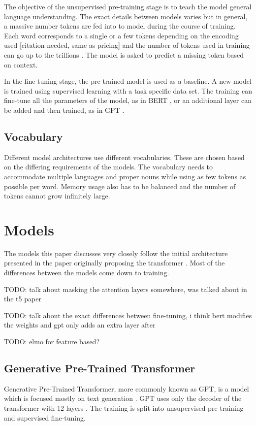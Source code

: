 \documentclass[twoside]{article}
\begin{document}
The objective of the unsupervised pre-training stage is to teach the model
general language understanding. The exact details between models varies but
in general, a massive number tokens are fed into to model during the course
of training. Each word corresponds to a single or a few tokens depending on 
the encoding used [citation needed, same as pricing] and the number of tokens
used in training can go up to the trillions \cite{raffel_exploring_2020}. 
The model is asked to predict a missing token based on context. 

In the fine-tuning stage, the pre-trained model is used as a baseline. A new
model is trained using supervised learning with a task specific data set. 
The training can fine-tune all the parameters of the model, as in BERT 
\cite{devlin_bert_2019}, or an additional layer can be added and then
trained, as in GPT \cite{radford_improving_nodate}.

\subsection{Vocabulary}
Different model architectures use different vocabularies. These are chosen based
on the differing requirements of the models. The vocabulary needs to accommodate 
multiple languages and proper nouns while using as few tokens as possible per word.
Memory usage also has to be balanced and the number of tokens cannot grow infinitely
large. 

\section{Models}

The models this paper discusses very closely follow the initial architecture
presented in the paper originally proposing the transformer 
\cite{vaswani_attention_2017}. Most of the differences between 
the models come down to training.

TODO: talk about masking the attention layers somewhere, was talked about in
the t5 paper

TODO: talk about the exact differences between fine-tuning,
i think bert modifies the weights and gpt only adds an extra layer after

TODO: elmo for feature based?

\subsection{Generative Pre-Trained Transformer}
Generative Pre-Trained Transformer, more commonly known as GPT, is a model
which is focused mostly on text generation \cite{brown_language_2020}. 
GPT uses only the decoder of the transformer with 12 layers 
\cite{radford_improving_nodate}. The training is split into unsupervised
pre-training and supervised fine-tuning. 
\end{document}
